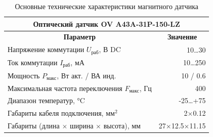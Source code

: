 \documentclass[a4paper]{article}
\begin{document}
\begin{table}[H]
    \caption{Основные технические характеристики магнитного датчика}
    \centering
    \begin{tabular}{|l|r|}
        \hline
        \multicolumn{2}{|c|}{\textbf{Оптический датчик OV A43A-31P-150-LZ}} \\ \hline\hline
        \multicolumn{1}{|c|}{\textbf{Параметр}} & \multicolumn{1}{|c|}{\textbf{Значение}} \\ \hline
        Напряжение коммутации $U_{\text{раб}}$, В DC & 10\dots 30 \\ \hline
        Ток коммутации $I_{\text{раб}}$, мА & 10\dots 250 \\ \hline
        Мощность $P_{\text{макс}}$, Вт акт. / ВА инд. & 10 / 0.6 \\ \hline
        Максимальная частота переключения $F_{\text{макс}}$, Гц & 400 \\ \hline
        Диапазон температур, °C & -25\dots +75 \\ \hline
        Габариты кабеля подключения, мм$^2$ & 2$\times$0.12 \\ \hline
        Габариты (длина $\times$ ширина $\times$ высота), мм & 27$\times$12.5$\times$11.15 \\ \hline
    \end{tabular}
    \label{tab:mag}
\end{table}
\end{document}
